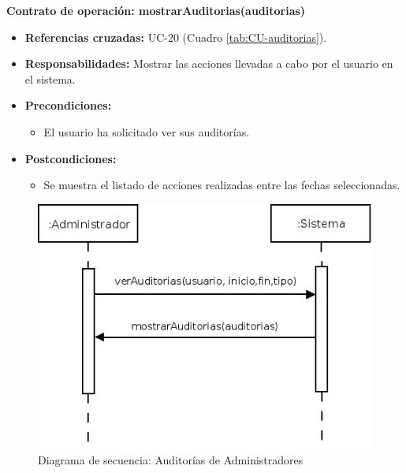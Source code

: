 \textbf{Contrato de operación: mostrarAuditorias(auditorias)}
\begin{itemize}
\item \textbf{Referencias cruzadas:} UC-20 (Cuadro \ref{tab:CU-auditorias}).
\item \textbf{Responsabilidades:} Mostrar las acciones llevadas a cabo por el usuario en el sistema.
\item \textbf{Precondiciones:} 
 \begin{itemize}
\item El usuario ha solicitado ver sus auditorías.
\end {itemize}
\item \textbf{Postcondiciones:} 
 \begin{itemize}
\item Se muestra el listado de acciones realizadas entre las fechas seleccionadas.
\end {itemize}
\end {itemize}


\vspace{10mm}

\begin{figure}[H]
\centering
  \includegraphics[scale=.55]{img/secuencias/auditorias-administrador.jpeg}
  \caption{Diagrama de secuencia: Auditorías de Administradores}
  \label{fig:secuencia-auditorias-administrador}
\end{figure}

